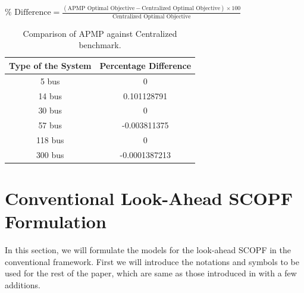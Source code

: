 \documentclass[preprint,12pt,3p]{elsarticle}
\begin{document}
$\%\text{ Difference}=\frac{(\text{APMP Optimal Objective}-\text{Centralized Optimal Objective})\times 100}{\text{Centralized Optimal Objective}}$
\begin{table}[ht] 

\caption{Comparison of APMP against Centralized benchmark.} %

\centering %

\begin{tabular}{| c | c |} %

\hline\hline %

Type of the System & Percentage Difference \\ [0.5ex] %


\hline %

5 bus &	0 \\ [0.5ex] %
\hline
14 bus & 0.101128791 \\ [0.5ex] %
\hline
30 bus &	0 \\ [0.5ex] %
\hline
57 bus &	-0.003811375 \\ [0.5ex] %
\hline
118 bus &	0 \\ [0.5ex] %
\hline
300 bus &	-0.0001387213 \\ [0.5ex] %
\hline
\end{tabular} 

\label{table:APMPCentComp} %

\end{table}
\section{Conventional Look-Ahead SCOPF Formulation}
\label{conventional}
In this section, we will formulate the models for the look-ahead SCOPF in the conventional framework. First we will introduce the notations and symbols to be used for the rest of the paper, which are same as those introduced in \cite{CK:14} with a few additions.
\end{document}
